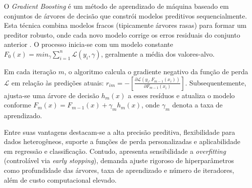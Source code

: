O \textit{Gradient Boosting} é um método de aprendizado de máquina baseado em conjuntos de árvores de decisão que
constrói modelos preditivos sequencialmente. Esta técnica combina modelos fracos (tipicamente árvores rasas) para formar
um preditor robusto, onde cada novo modelo corrige os erros residuais do conjunto anterior \cite{friedman}. O processo
inicia-se com um modelo constante $F_0(x) = min_{\gamma} \sum_{i=1}^n \mathcal{L}(y_i, \gamma)$, geralmente a média
dos valores-alvo. 

Em cada iteração $m$, o algoritmo calcula o gradiente negativo da função de perda $\mathcal{L}$ em relação às predições
atuais: $r_{im} = -\left[ \frac{\partial \mathcal{L}(y_i, F_{m-1}(x_i))}{\partial F_{m-1}(x_i)} \right]$.
Subsequentemente, ajusta-se uma árvore de decisão $h_m(x)$ a esses resíduos e atualiza o modelo conforme $F_m(x) =
F_{m-1}(x) + \gamma_m h_m(x)$, onde $\gamma_m$ denota a taxa de aprendizado. 

Entre suas vantagens destacam-se a alta precisão preditiva, flexibilidade para dados heterogêneos, suporte a funções de
perda personalizadas e aplicabilidade em regressão e classificação. Contudo, apresenta sensibilidade a
\textit{overfitting} (controlável via \textit{early stopping}), demanda ajuste rigoroso de hiperparâmetros como
profundidade das árvores, taxa de aprendizado e número de iteradores, além de custo computacional elevado.
